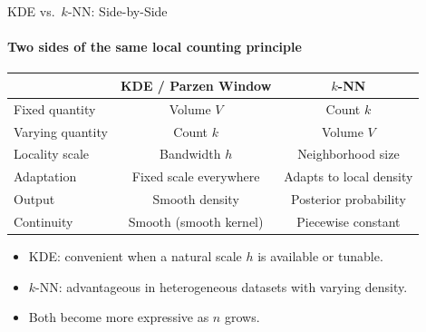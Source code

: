 \begin{frame}{KDE vs.\ $k$-NN: Side-by-Side}
  \framesubtitle{Two sides of the same local counting principle}
  \begin{center}
  \begin{tabular}{lcc}
    \toprule
    & \textbf{KDE / Parzen Window} & \textbf{$k$-NN} \\
    \midrule
    Fixed quantity & Volume $V$ & Count $k$ \\
    Varying quantity & Count $k$ & Volume $V$ \\
    Locality scale & Bandwidth $h$ & Neighborhood size \\
    Adaptation & Fixed scale everywhere & Adapts to local density \\
    Output & Smooth density & Posterior probability \\
    Continuity & Smooth (smooth kernel) & Piecewise constant \\
    \bottomrule
  \end{tabular}
  \end{center}
  \bigskip
  \begin{itemize}
    \item KDE: convenient when a natural scale $h$ is available or tunable.
    \item $k$-NN: advantageous in heterogeneous datasets with varying density.
    \item Both become more expressive as $n$ grows.
  \end{itemize}
\end{frame}

